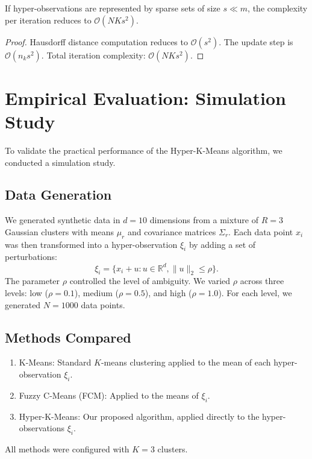 \documentclass[twoside]{article}
\begin{document}
\begin{thm}
If hyper-observations are represented by sparse sets of size $s \ll m$, the complexity per iteration reduces to $\mathcal{O}(N K s^2)$.
\end{thm}
\begin{proof}
Hausdorff distance computation reduces to $\mathcal{O}(s^2)$. The update step is $\mathcal{O}(n_k s^2)$. Total iteration complexity: $\mathcal{O}(N K s^2)$.
\end{proof}

\section{Empirical Evaluation: Simulation Study}
To validate the practical performance of the Hyper-K-Means algorithm, we conducted a simulation study.

\subsection{Data Generation}
We generated synthetic data in $d=10$ dimensions from a mixture of $R=3$ Gaussian clusters with means $\mu_r$ and covariance matrices $\Sigma_r$. Each data point $x_i$ was then transformed into a hyper-observation $\xi_i$ by adding a set of perturbations:
\[
\xi_i = \{x_i + u : u \in \mathbb{R}^d, \|u\|_2 \le \rho\}.
\]
The parameter $\rho$ controlled the level of ambiguity. We varied $\rho$ across three levels: low ($\rho=0.1$), medium ($\rho=0.5$), and high ($\rho=1.0$). For each level, we generated $N=1000$ data points.

\subsection{Methods Compared}
\begin{enumerate}
    \item K-Means: Standard $K$-means clustering applied to the mean of each hyper-observation $\xi_i$.
    \item Fuzzy C-Means (FCM): Applied to the means of $\xi_i$.
    \item Hyper-K-Means: Our proposed algorithm, applied directly to the hyper-observations $\xi_i$.
\end{enumerate}
All methods were configured with $K=3$ clusters.
\end{document}
